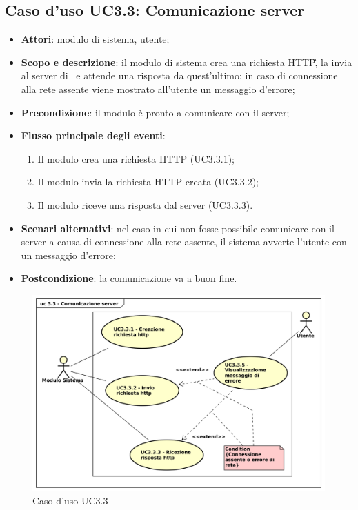 \subsection{Caso d'uso UC3.3: Comunicazione server}
\label{sec:UC3.3}

\begin{itemize}
\item \textbf{Attori}: modulo di sistema, utente;
\item \textbf{Scopo e descrizione}: il modulo di sistema crea una richiesta HTTP\G, la invia al server di \AZIENDA\ e attende una risposta da quest'ultimo; in caso di connessione alla rete assente viene mostrato all'utente un messaggio d'errore;
\item \textbf{Precondizione}: il modulo è pronto a comunicare con il server;
\item \textbf{Flusso principale degli eventi}:
\begin{enumerate}
\item Il modulo crea una richiesta HTTP (UC3.3.1);
\item Il modulo invia la richiesta HTTP creata (UC3.3.2);
\item Il modulo riceve una risposta dal server (UC3.3.3).
\end{enumerate}
\item \textbf{Scenari alternativi}: nel caso in cui non fosse possibile comunicare con il server a causa di connessione alla rete assente, il sistema avverte l'utente con un messaggio d'errore;  
\item \textbf{Postcondizione}: la comunicazione va a buon fine.
\end{itemize}
\begin{figure}[htbp]
\centering
\includegraphics[scale=0.5]{immagini/uc3_3_comunicazione_server.png}
\captionsetup{labelfont=bf}
\caption{Caso d'uso UC3.3}
\end{figure}
\newpage

